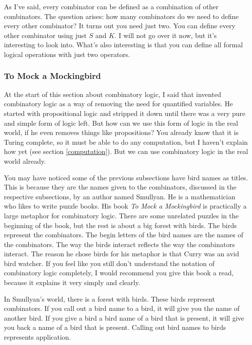 \documentclass[11pt]{article}
\begin{document}
As I've said, every combinator can be defined as a combination of other
combinators. The question arises: how many combinators do we need to define
every other combinator? It turns out you need just two. You can define every
other combinator using just \(S\) and \(K\). I will not go over it now, but
it's interesting to look into. What's also interesting is that you can define
all formal logical operations with just two operators.

\subsubsection{To Mock a Mockingbird}

At the start of this section about combinatory logic, I said that
\textcite{schonfinkel1924} invented combinatory logic as a way of removing the
need for quantified variables. He started with propositional logic and stripped
it down until there was a very pure and simple form of logic left. But how can
we use this form of logic in the real world, if he even removes things like
propositions? You already know that it is Turing complete, so it must be able
to do any computation, but I haven't explain how yet (see section
\ref{computation}). But we can use combinatory logic in the real world already.

You may have noticed some of the previous subsections have bird names as
titles. This is because they are the names given to the combinators, discussed
in the respective subsections, by an author named Smullyan. He is a
mathematician who likes to write puzzle books. His book \emph{To Mock a
Mockingbird} \parencite{smullyan2000} is practically a large metaphor for
combinatory logic. There are some unrelated puzzles in the beginning of the
book, but the rest is about a big forest with birds. The birds represent the
combinators. The begin letters of the bird names are the names of the
combinators. The way the birds interact reflects the way the combinators
interact. The reason he chose birds for his metaphor is that Curry was an avid
bird watcher. If you feel like you still don't understand the notation of
combinatory logic completely, I would recommend you give this book a read,
because it explains it very simply and clearly.

In Smullyan's world, there is a forest with birds. These birds represent
combinators. If you call out a bird name to a bird, it will give you the name
of another bird. If you give a bird a bird name of a bird that is present, it
will give you back a name of a bird that is present. Calling out bird names to
birds represents application.
\end{document}
